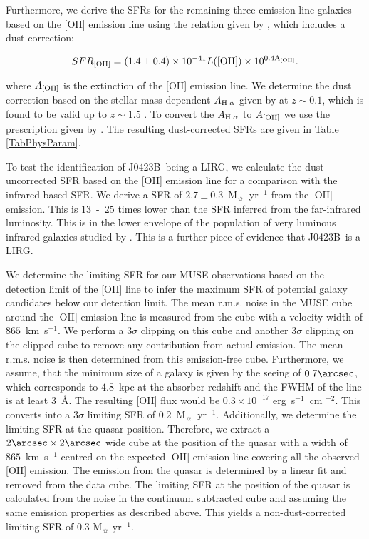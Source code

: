 \documentclass[a4paper,fleqn,usenatbib]{mnras}
\newcommand{\GalB}{J0423B}
\begin{document}
Furthermore, we derive the SFRs for the remaining three emission line galaxies based on the [OII] emission line using the relation given by \mbox{\citet{Kennicutt1998starformation}}, which includes a dust correction:

\begin{equation}
SFR_{\rm [OII]} = (1.4 \pm 0.4) \times 10^{-41} L([\rm{OII}]) \times 10^{0.4 A_{\rm [OII]}} .
\end{equation}

where $A_{\rm [OII]}$ is the extinction of the [OII] emission line. We determine the dust correction based on the stellar mass dependent $A_{\rm H\; \alpha}$ given by \citet{Garn2010predicting} at $z \sim 0.1$, which is found to be valid up to $z \sim 1.5$ \citep{Sobral2012star}. To convert the $A_{\rm H\; \alpha}$ to $A_{\rm [OII]}$ we use the prescription given by \citet{Calzetti1997reddening}. The resulting dust-corrected SFRs are given in Table \ref{TabPhysParam}. 

To test the identification of \GalB\ being a LIRG, we calculate the dust-uncorrected  SFR based on the [OII] emission line for a comparison with the infrared based SFR. We derive a SFR of \mbox{$2.7 \pm 0.3$~M$_{\sun}$~yr$^{-1}$} from the [OII] emission. This is $13$~-~$25$ times lower than the SFR inferred from the far-infrared luminosity. This is in the lower envelope of the population of very luminous infrared galaxies studied by \citep{Poggianti2000optical}. This is a further piece of evidence that \GalB\ is a LIRG.


We determine the limiting SFR for our MUSE observations based on the detection limit of the [OII] line to infer the maximum SFR of potential galaxy candidates below our detection limit. The mean r.m.s. noise in the MUSE cube around the [OII] emission line is measured from the cube with a velocity width of $865$~km~s$^{-1}$. We perform a $3\sigma$ clipping on this cube and another $3\sigma$ clipping on the clipped cube to remove any contribution from actual emission. The mean r.m.s. noise is then determined from this emission-free cube. Furthermore, we assume, that the minimum size of a galaxy is given by the seeing of $0.7\arcsec$, which corresponds to $4.8$~kpc at the absorber redshift and the FWHM of the line is at least $3$~\AA. The resulting [OII] flux would be $0.3 \times 10^{-17}$ erg~s$^{-1}$~cm $^{-2}$. This converts into a 3$\sigma$ limiting SFR of $0.2$~M$_{\sun}$~yr$^{-1}$. Additionally, we determine the limiting SFR at the quasar position. Therefore, we extract a $2\arcsec \times 2\arcsec$ wide cube at the position of the quasar with a width of $865$~km~s$^{-1}$ centred on the expected [OII] emission line covering all the observed [OII] emission. The emission from the quasar is determined by a linear fit and removed from the data cube. The limiting SFR at the position of the quasar is calculated from the noise in the continuum subtracted cube and assuming the same emission properties as described above. This yields a non-dust-corrected limiting SFR of $0.3\text{ M}_{\sun}\text{ yr}^{-1}$.
\end{document}
